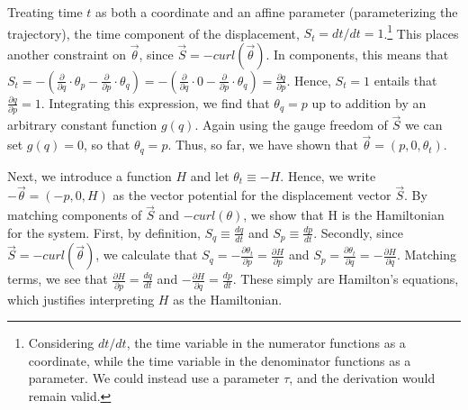 \documentclass[letterpaper]{article}
\renewcommand{\vector}[1]{\ensuremath{\vec{#1}}} %
\begin{document}
Treating time $t$ as both a coordinate and an affine parameter (parameterizing the trajectory), the time component of the displacement, $S_t = dt/ dt = 1$.\footnote{Considering $dt/dt$, the time variable in the numerator functions as a coordinate, while the time variable in the denominator functions as a parameter. We could instead use a parameter $\tau$, and the derivation would remain valid.} This places another constraint on $\vector{\theta} $, since $\vector{S} = -curl(\vector{\theta}) $. In components, this means that $S_t = - (\frac{\partial}{\partial q} \cdot \theta_p - \frac{\partial}{\partial p} \cdot \theta_q) = - (\frac{\partial}{\partial q} \cdot 0 - \frac{\partial}{\partial p} \cdot \theta_q) = \frac{\partial q}{\partial p}$. Hence, $S_t = 1$ entails that $\frac{\partial q}{\partial p} = 1$. Integrating this expression, we find that $\theta_q = p$ up to addition by an arbitrary constant function $g(q)$. Again using the gauge freedom of $\vector{S}$ we can set $g(q)=0$, so that $\theta_q = p$. Thus, so far, we have shown that $\vector{\theta} = (p, 0,\theta_t) $.

Next, we introduce a function $H$ and let $ \theta_t \equiv -H$. Hence, we write $-\vector{\theta} = (-p, 0, H) $ as the vector potential for the displacement vector $\vector{S} $. By matching components of $\vector{S}$ and $-curl(\theta)$, we show that H is the Hamiltonian for the system. First, by definition, $S_q \equiv \frac{dq}{dt} $ and $S_p \equiv  \frac{dp}{dt} $. Secondly, since $\vector{S} = -curl(\vector{\theta}) $, we calculate that $S_q = -\frac{\partial \theta_t}{\partial p} = \frac{\partial H}{\partial p}$ and $S_p = \frac{\partial \theta_t}{\partial q}=-\frac{\partial H}{\partial q}$. Matching terms, we see that $\frac{\partial H}{\partial p} =\frac{dq}{dt} $ and $-\frac{\partial H}{\partial q} =\frac{dp}{dt}$. These simply are Hamilton's equations, which justifies interpreting $H$ as the Hamiltonian.

\end{document}
